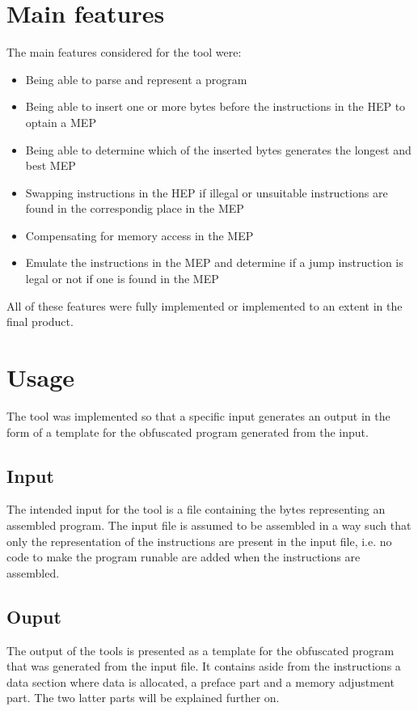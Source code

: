 \documentclass[11pt,twoside]{eitExjobb}
\begin{document}
\section{Main features}
The main features considered for the tool were:

\begin{itemize}
\item{Being able to parse and represent a program}
\item{Being able to insert one or more bytes before the instructions in the HEP to optain a MEP}
\item{Being able to determine which of the inserted bytes generates the longest and best MEP}
\item{Swapping instructions in the HEP if illegal or unsuitable instructions are found in the correspondig place in the MEP}
\item{Compensating for memory access in the MEP}
\item{Emulate the instructions in the MEP and determine if a jump instruction is legal or not if one is found in the MEP}
\end{itemize}

\noindent All of these features were fully implemented or implemented to an extent in the final product. 

\section{Usage}
The tool was implemented so that a specific input generates an output in the form of a template for the obfuscated program generated from the input.  

\subsection{Input}
The intended input for the tool is a file containing the bytes representing an assembled program. The input file is assumed to be assembled in a way such that only the representation of the instructions are present in the input file, i.e. no code to make the program runable are added when the instructions are assembled.

\subsection{Ouput}
The output of the tools is presented as a template for the obfuscated program that was generated from the input file. It contains aside from the instructions a data section where data is allocated, a preface part and a memory adjustment part. The two latter parts will be explained further on.
\end{document}
